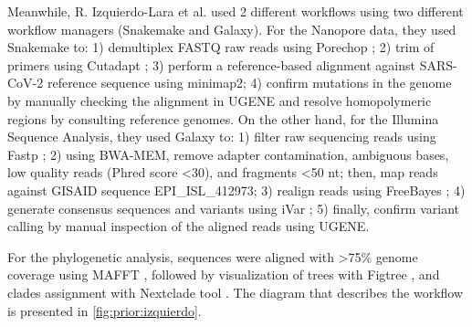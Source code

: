         Meanwhile, R. Izquierdo-Lara et al. \cite{izquierdo} used 2 different workflows using two different workflow managers (Snakemake and Galaxy). For the Nanopore data, they used Snakemake to: 1) demultiplex FASTQ raw reads using Porechop \cite{wick2022}; 2) trim of primers using Cutadapt \cite{martin2011}; 3) perform a reference-based alignment against SARS-CoV-2 reference sequence using minimap2; 4) confirm mutations in the genome by manually checking the alignment in UGENE \cite{okonechnikov2012} and resolve homopolymeric regions by consulting reference genomes. On the other hand, for the Illumina Sequence Analysis, they used Galaxy to: 1) filter raw sequencing reads using Fastp \cite{chen2018}; 2) using BWA-MEM, remove adapter contamination, ambiguous bases, low quality reads (Phred score <30), and fragments <50 nt; then, map reads against GISAID sequence EPI\_ISL\_412973; 3) realign reads using FreeBayes \cite{garrison2012}; 4) generate consensus sequences and variants using iVar \cite{grubaugh2019}; 5) finally, confirm variant calling by manual inspection of the aligned reads using UGENE.

        For the phylogenetic analysis, sequences were aligned with >75\% genome coverage using MAFFT \cite{mafft}, followed by visualization of trees with Figtree \cite{figtree}, and clades assignment with Nextclade tool \cite{nextclade2022}. The diagram that describes the workflow is presented in \cref{fig:prior:izquierdo}.
        
